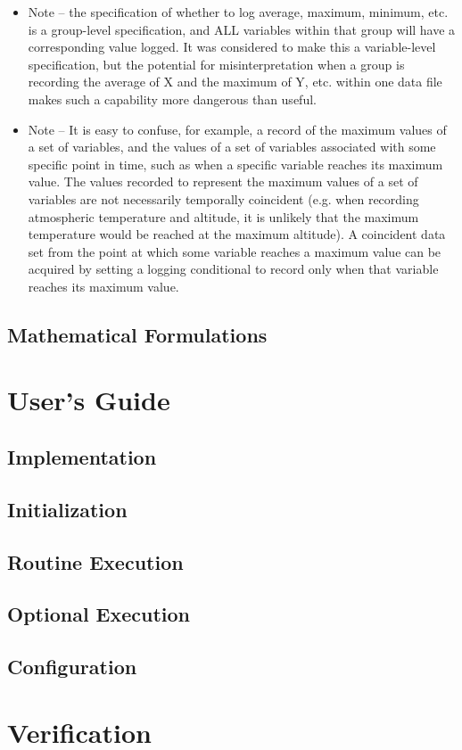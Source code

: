 \documentclass[11pt,fleqn]{report}
\begin{document}
\begin{itemize}
  \begin{itemize}
    \item Note – the specification of whether to log average, maximum,
          minimum, etc. is a group-level specification, and ALL variables
          within that group will have a corresponding value logged.
          It was considered to make this a variable-level specification,
          but the potential for misinterpretation when a group is
          recording the average of X and the maximum of Y, etc.
          within one data file makes such a capability more dangerous
          than useful.
    \item Note – It is easy to confuse, for example, a record of the
          maximum values of a set of variables, and the values of a set
          of variables associated with some specific point in time, such
          as when a specific variable reaches its maximum value.
          The values recorded to represent the maximum values of a
          set of variables are not necessarily temporally coincident
          (e.g. when recording atmospheric temperature and altitude,
          it is unlikely that the maximum temperature would be reached
          at the maximum altitude). A coincident data set from the
          point at which some variable reaches a maximum value can
          be acquired by setting a logging conditional to record only
          when that variable reaches its maximum value.
  \end{itemize}
\end{itemize}

\section {Mathematical Formulations}

\chapter {User's Guide}
\section {Implementation}
\section {Initialization}
\section {Routine Execution}
\section {Optional Execution}
\section {Configuration}

\chapter{Verification}
\end{document}

